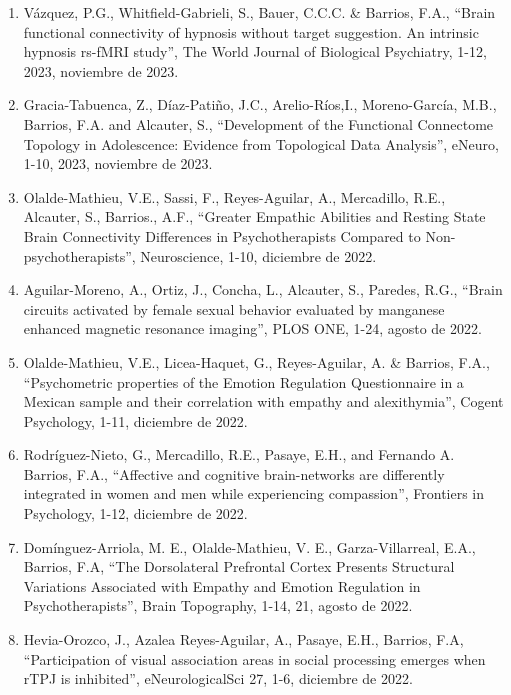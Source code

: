 \begin{enumerate}
\item Vázquez, P.G., Whitfield-Gabrieli, S., Bauer, C.C.C. \& Barrios, F.A., “Brain functional connectivity of hypnosis without target suggestion. An intrinsic 
hypnosis rs-fMRI study”, The World Journal of Biological Psychiatry, 1-12, 2023,  noviembre de 2023.

\item Gracia-Tabuenca, Z., Díaz-Patiño, J.C., Arelio-Ríos,I., Moreno-García, M.B., Barrios, F.A. and Alcauter, S., “Development of the Functional Connectome 
Topology in Adolescence: Evidence from Topological Data Analysis”, eNeuro, 1-10, 2023,  noviembre de 2023.

\item Olalde-Mathieu, V.E., Sassi, F., Reyes-Aguilar, A., Mercadillo, R.E., Alcauter, S., Barrios., A.F., “Greater Empathic Abilities and Resting State Brain 
Connectivity Differences in Psychotherapists Compared to Non-psychotherapists”, Neuroscience, 1-10,  diciembre de 2022.

\item Aguilar-Moreno, A., Ortiz, J., Concha, L., Alcauter, S., Paredes, R.G., “Brain circuits activated by female sexual behavior evaluated by manganese enhanced 
magnetic resonance imaging”, PLOS ONE, 1-24,  agosto de 2022. 

\item Olalde-Mathieu, V.E., Licea-Haquet, G., Reyes-Aguilar, A. \& Barrios, F.A., “Psychometric properties of the Emotion Regulation Questionnaire in a Mexican 
sample and their correlation with empathy and alexithymia”, Cogent Psychology, 1-11,  diciembre de 2022.

\item Rodríguez-Nieto, G., Mercadillo, R.E., Pasaye, E.H., and Fernando A. Barrios, F.A., “Affective and cognitive brain-networks are differently integrated in 
women and men while experiencing compassion”, Frontiers in Psychology, 1-12,  diciembre de 2022.

\item Domínguez-Arriola, M. E., Olalde-Mathieu, V. E., Garza-Villarreal, E.A., Barrios, F.A, “The Dorsolateral Prefrontal Cortex Presents Structural Variations 
Associated with Empathy and Emotion Regulation in Psychotherapists”, Brain Topography, 1-14, 21,  agosto de 2022.

\item Hevia-Orozco, J., Azalea Reyes-Aguilar, A., Pasaye, E.H., Barrios, F.A, “Participation of visual association areas in social processing emerges when rTPJ 
is 
inhibited”, eNeurologicalSci 27, 1-6,  diciembre de 2022.


\end{enumerate}
